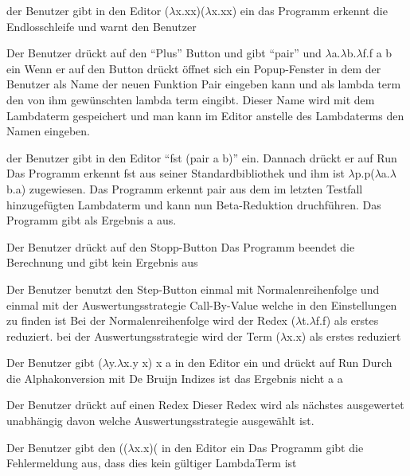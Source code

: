 \documentclass[parskip=full,11pt,twoside]{scrartcl}
\begin{document}
{der Benutzer gibt in den Editor ($\lambda$x.xx)($\lambda$x.xx) ein }
{ das Programm erkennt die Endlosschleife und warnt den Benutzer }

{ Der Benutzer drückt auf den \enquote {Plus} Button und gibt \enquote {pair} und $\lambda$a.$\lambda$b.$\lambda$f.f a b ein }
{Wenn er auf den Button drückt öffnet sich ein Popup-Fenster in dem der Benutzer als Name der neuen Funktion Pair eingeben kann und als lambda term den von ihm gewünschten lambda term eingibt. Dieser Name wird mit dem Lambdaterm gespeichert und man kann im Editor anstelle des Lambdaterms den Namen eingeben. }

{ der Benutzer gibt in den Editor \enquote {fst (pair a b)} ein. Dannach drückt er auf Run}
{ Das Programm erkennt fst aus seiner Standardbibliothek und ihm ist $\lambda$p.p($\lambda$a.$\lambda$b.a) zugewiesen. Das Programm erkennt pair aus dem im letzten Testfall hinzugefügten Lambdaterm und kann nun Beta-Reduktion druchführen. Das Programm gibt als Ergebnis a aus.}

{Der Benutzer drückt auf den Stopp-Button}
{ Das Programm beendet die Berechnung und gibt kein Ergebnis aus }

{Der Benutzer benutzt den Step-Button einmal mit Normalenreihenfolge  und einmal mit der Auswertungsstrategie Call-By-Value welche in den Einstellungen zu finden ist}
{ Bei der Normalenreihenfolge wird der Redex ($\lambda$t.$\lambda$f.f) als erstes reduziert. bei der Auswertungsstrategie wird der Term ($\lambda$x.x) als erstes reduziert }

{ Der Benutzer gibt ($\lambda$y.$\lambda$x.y x) x a in den Editor ein und drückt auf Run}
{ Durch die Alphakonversion mit De Bruijn Indizes ist das Ergebnis nicht a  a  }

 { Der Benutzer drückt auf einen Redex}
{ Dieser Redex wird als nächstes ausgewertet unabhängig davon welche Auswertungsstrategie ausgewählt ist. }

{ Der Benutzer gibt den (($\lambda$x.x)( in den Editor ein }
{ Das Programm gibt die Fehlermeldung aus, dass dies kein gültiger LambdaTerm ist }
\end{document}
